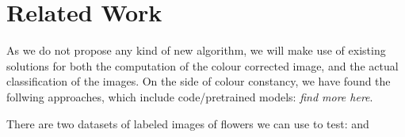 \section{Related Work}

As we do not propose any kind of new algorithm, we will make use of existing solutions for both
the computation of the colour corrected image, and the actual classification of the images.
On the side of colour constancy, we have found the follwing approaches, which include code/pretrained models:
\cite{hu2017fc} {\it find more here}.

There are two datasets of labeled images of flowers we can use to test: \cite{Nilsback06} and \cite{Nilsback08}
